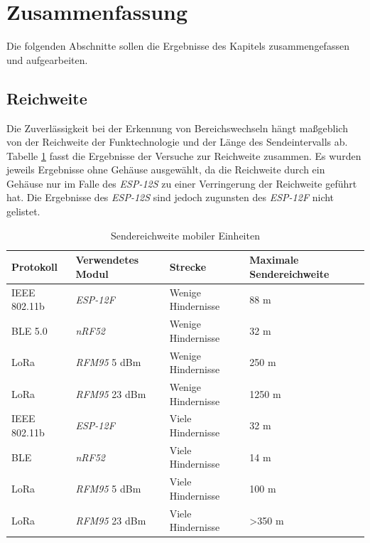 \section{Zusammenfassung}
Die folgenden Abschnitte sollen die Ergebnisse des Kapitels zusammengefassen und aufgearbeiten.

\subsection{Reichweite}
Die Zuverlässigkeit bei der Erkennung von Bereichswechseln hängt maßgeblich von der Reichweite der Funktechnologie und der Länge des Sendeintervalls ab.
Tabelle \ref{table:ranges} fasst die Ergebnisse der Versuche zur Reichweite zusammen. 
Es wurden jeweils Ergebnisse ohne Gehäuse ausgewählt, da die Reichweite durch ein Gehäuse nur im Falle des \emph{ESP-12S} zu einer Verringerung der Reichweite geführt hat. 
Die Ergebnisse des \emph{ESP-12S} sind jedoch zugunsten des \emph{ESP-12F} nicht gelistet.

\begin{table}[h]
	\centering
	\caption{Sendereichweite mobiler Einheiten}
	\label{table:ranges}
	\begin{tabular}{l|l|l|p{3cm}}
		Protokoll & Verwendetes Modul & Strecke & Maximale Sendereichweite \\
		\hline
		IEEE 802.11b & \emph{ESP-12F} & Wenige Hindernisse & 88 m \\
		BLE 5.0 & \emph{nRF52} & Wenige Hindernisse & 32 m \\
		LoRa & \emph{RFM95} 5 dBm & Wenige Hindernisse & 250 m \\
		LoRa & \emph{RFM95} 23 dBm & Wenige Hindernisse & 1250 m \\
		\hline
		IEEE 802.11b & \emph{ESP-12F}  & Viele Hindernisse & 32 m \\
		BLE & \emph{nRF52}  & Viele Hindernisse & 14 m \\
		LoRa & \emph{RFM95} 5 dBm & Viele Hindernisse & 100 m \\
		LoRa & \emph{RFM95} 23 dBm & Viele Hindernisse & >350 m \\
	\end{tabular}
\end{table}

